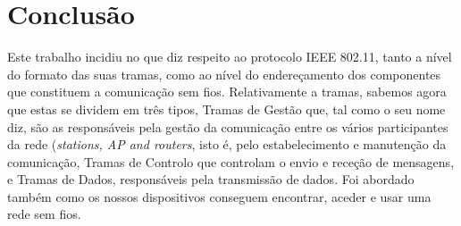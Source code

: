 \documentclass[a4paper]{article}
\begin{document}
\section{Conclusão}
Este trabalho incidiu no que diz respeito ao protocolo IEEE 802.11, tanto a nível do formato
das suas tramas, como ao nível do endereçamento dos componentes que constituem a comunicação sem fios. 
Relativamente a tramas, sabemos agora que estas se dividem em três tipos, Tramas de Gestão que, tal como o seu nome diz, são as responsáveis pela gestão da comunicação entre os vários participantes da rede (\textit{stations, AP and routers}, isto é, pelo estabelecimento e manutenção da comunicação, Tramas de Controlo que controlam o envio e receção de mensagens, e Tramas de Dados, responsáveis pela transmissão de dados.
Foi abordado também como os nossos dispositivos conseguem encontrar, aceder e usar uma rede sem fios.
\end{document}
